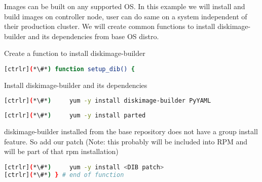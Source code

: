 
	Images can be built on any supported OS. In this example we will install and build images on controller node, user can do same on a system independent of their production cluster. We will create common functions to install diskimage-builder and its dependencies from base OS distro.

	Create a function to install diskimage-builder

\begin{lstlisting}[language=bash,keywords={}]
[ctrlr](*\#*) function setup_dib() {
\end{lstlisting}
	Install diskimage-builder and its dependencies
\begin{lstlisting}[language=bash,keywords={}]
[ctrlr](*\#*)     yum -y install diskimage-builder PyYAML

\end{lstlisting}

\begin{lstlisting}[language=bash,keywords={}]
[ctrlr](*\#*)     yum -y install parted
\end{lstlisting}

	diskimage-builder installed from the base repository does not have a group install feature. So add our patch (Note: this probably will be included into RPM and will be part of that rpm installation)


\begin{lstlisting}[language=bash,keywords={}]
[ctrlr](*\#*)     yum -y install <DIB patch>
[ctrlr](*\#*) } # end of function
\end{lstlisting}
